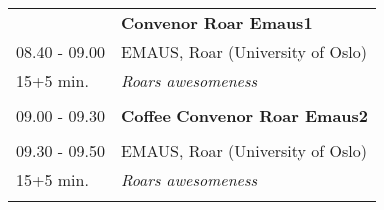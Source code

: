\begin{table}[h!]
\begin{tabular}{p{3cm}p{13cm}}
&\hfill {\bf Convenor Roar Emaus1 }\\ 
08.40 - 09.00 & EMAUS, Roar (University of Oslo)\\ 
15+5 min. & {\it Roars awesomeness}\\ 
 & \\ 
09.00 - 09.30 & {\bf Coffee} \hfill {\bf Convenor Roar Emaus2 }\\ 
 & \\ 
09.30 - 09.50 & EMAUS, Roar (University of Oslo)\\ 
15+5 min. & {\it Roars awesomeness}\\ 
 & \\ 
\end{tabular}
\end{table}

